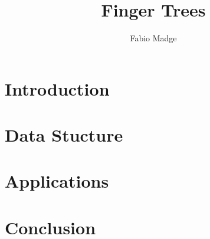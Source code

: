\documentclass[a4paper]{article}
\begin{document}
\title{Finger Trees}
\author{Fabio Madge}
\date{}
\maketitle

\begin{abstract}

\end{abstract}

\section{Introduction}


\section{Data Stucture}


\section{Applications}


\section{Conclusion}




\end{document}
